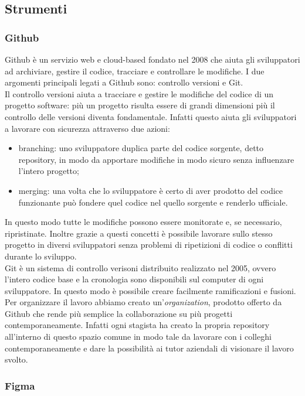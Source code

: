 \subsection{Strumenti}

\subsubsection{Github}

Github è un servizio web e cloud-based fondato nel 2008 che aiuta gli sviluppatori ad archiviare, gestire il codice, tracciare e controllare le modifiche. I due argomenti principali legati a Github sono: controllo versioni e Git.\\
Il controllo versioni aiuta a tracciare e gestire le modifiche del codice di un progetto software: più un progetto risulta essere di grandi dimensioni più il controllo delle versioni diventa fondamentale. Infatti questo aiuta gli sviluppatori a lavorare con sicurezza attraverso due azioni:
\begin{itemize}
	\item branching: uno sviluppatore duplica parte del codice sorgente, detto repository, in modo da apportare modifiche in modo sicuro senza influenzare l'intero progetto;
	\item merging: una volta che lo sviluppatore è certo di aver prodotto del codice funzionante può fondere quel codice nel quello sorgente e renderlo ufficiale.
\end{itemize}
In questo modo tutte le modifiche possono essere monitorate e, se necessario, ripristinate. Inoltre grazie a questi concetti è possibile lavorare sullo stesso progetto in diversi sviluppatori senza problemi di ripetizioni di codice o conflitti durante lo sviluppo.\\
Git è un sistema di controllo verisoni distribuito realizzato nel 2005, ovvero l'intero codice base e la cronologia sono disponibili sul computer di ogni sviluppatore. In questo modo è possibile creare facilmente ramificazioni e fusioni.\\
Per organizzare il lavoro abbiamo creato un'\textit{organization}, prodotto offerto da Github che rende più semplice la collaborazione su più progetti contemporaneamente. Infatti ogni stagista ha creato la propria repository all'interno di questo spazio comune in modo tale da lavorare con i colleghi contemporaneamente e dare la possibilità ai tutor aziendali di visionare il lavoro svolto.

\subsubsection{Figma}


